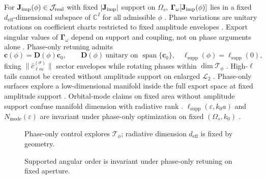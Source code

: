 \label{thm:ch4.phase-manifold-rank}
For \(\mathbf{J}_{\mathrm{imp}}(\phi)\in\mathcal{J}_{\mathrm{real}}\) with fixed \(|\mathbf{J}_{\mathrm{imp}}|\) support on \(\Omega_{s}\),
\(\boldsymbol{\Gamma}_\omega[\mathbf{J}_{\mathrm{imp}}(\phi)]\) lies in a fixed \(d_{\mathrm{eff}}\)-dimensional subspace of \(\mathbb{C}^{I}\) for all admissible \(\phi\)
\cite{stratton1941}.
Phase variations are unitary rotations on coefficient charts restricted to fixed amplitude envelopes \cite{harrington2001}. Export singular
values of \(\boldsymbol{\Gamma}_\omega\) depend on support and coupling, not on phase arguments alone \cite{hansen1988}.
Phase-only retuning admits
\begin{equation}
\label{eq:ch4.phase-amplitude-factor}
\mathbf{c}(\phi)=\mathbf{D}(\phi)\mathbf{c}_{0},\qquad
\mathbf{D}(\phi)\ \text{unitary on }\operatorname{span}\{\mathbf{c}_{0}\},\quad
\ell_{\mathrm{supp}}(\phi)=\ell_{\mathrm{supp}}(0),
\end{equation}
fixing \(\|\widehat{c}_{\ell m}^{(\sigma)}\|\) sector envelopes while rotating phases within \(\dim\mathcal{T}_{\phi}\)
\cite{stratton1941}. High-\(\ell\) tails cannot be created without amplitude support on enlarged \(\mathcal{L}_{2}\)
\cite{devaney2004}.
Phase-only surfaces explore a low-dimensional manifold inside the full export space at fixed amplitude support \cite{stratton1941}. Orbital-mode claims on fixed area without amplitude support confuse manifold dimension with radiative rank \cite{devaney2004}.
\label{lem:ch4.phase-retune-invariant}
\(\ell_{\mathrm{supp}}(\varepsilon,k_{0}a)\) and \(N_{\mathrm{mode}}(\varepsilon)\) are invariant under phase-only optimization on fixed \((\Omega_{s},k_{0})\)
\cite{stratton1941}.
\begin{figure}[t]
\centering
{}
\caption{Phase-only control explores \(\mathcal{T}_{\phi}\); radiative dimension \(d_{\mathrm{eff}}\) is fixed by geometry.}
\label{fig:ch4.phase-tangent-manifold}
\end{figure}
\begin{figure}[t]
\centering
{}
\caption{Supported angular order is invariant under phase-only retuning on fixed aperture.}
\label{fig:ch4.phase-ell-ceiling}
\end{figure}
